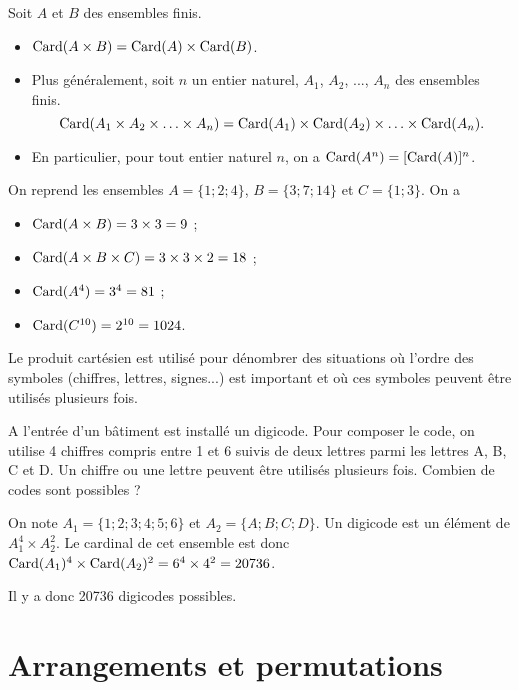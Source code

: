 \documentclass[11pt,fleqn, openany]{book} %
\begin{document}
\begin{proposition} Soit $A$ et $B$ des ensembles finis. 
\begin{itemize}
\item $\mathrm{Card} (A \times B)=\mathrm{Card}(A) \times  \mathrm{Card} (B)$.
\item Plus généralement, soit $n$ un entier naturel, $A_1$, $A_2$, ..., $A_n$ des ensembles finis. \[\mathrm{Card}(A_1 \times A_2 \times \ldots \times A_n)=\mathrm{Card}(A_1) \times \mathrm{Card}(A_2) \times \ldots \times \mathrm{Card}(A_n).\]
\item En particulier, pour tout entier naturel $n$, on a $\mathrm{Card}(A^n)=[\mathrm{Card}(A)]^n$.
\end{itemize}\end{proposition}


\begin{example} On reprend les ensembles $A=\{1;2;4\}$, $B=\{3;7;14\}$ et $C=\{1;3\}$. On a
\begin{itemize}
\item $\mathrm{Card}(A \times B)= 3 \times 3 = 9$ ;
\item $\mathrm{Card}(A \times B \times C) = 3 \times 3 \times 2 = 18$ ;
\item $\mathrm{Card}(A^4)=3^4=81$ ;
\item $\mathrm{Card}(C^{10})=2^{10}=1024$.
\end{itemize}\end{example}

\newpage

\begin{proposition} Le produit cartésien est utilisé pour dénombrer des situations où l'ordre des symboles (chiffres, lettres, signes...) est important et où ces symboles peuvent être utilisés plusieurs fois.\end{proposition}

\begin{example} A l'entrée d'un bâtiment est installé un digicode. Pour composer le code, on utilise 4 chiffres compris entre 1 et 6 suivis de deux lettres parmi les lettres A, B, C et D. Un chiffre ou une lettre peuvent être utilisés plusieurs fois. Combien de codes sont possibles ?

On note $A_1=\{1;2;3;4;5;6\}$ et $A_2=\{A;B;C;D\}$. Un digicode est un élément de $A_1^4 \times A_2 ^2$. Le cardinal de cet ensemble est donc $\mathrm{Card}(A_1)^4 \times \mathrm{Card}(A_2)^2 = 6^4 \times 4^2 = 20736$.

Il y a donc 20736 digicodes possibles.\end{example}


\section{Arrangements et permutations}
\end{document}
